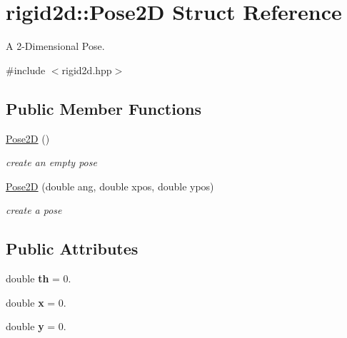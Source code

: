 \hypertarget{structrigid2d_1_1Pose2D}{}\section{rigid2d\+:\+:Pose2D Struct Reference}
\label{structrigid2d_1_1Pose2D}


A 2-\/\+Dimensional Pose.  




{\ttfamily \#include $<$rigid2d.\+hpp$>$}

\subsection*{Public Member Functions}
\begin{DoxyCompactItemize}
\item 
\mbox{\label{structrigid2d_1_1Pose2D_a88bf20c7ba06e18f9a8b01cef60e2c98}} 
\hyperlink{structrigid2d_1_1Pose2D_a88bf20c7ba06e18f9a8b01cef60e2c98}{Pose2D} ()
\begin{DoxyCompactList}\small\item\em create an empty pose \end{DoxyCompactList}\item 
\hyperlink{structrigid2d_1_1Pose2D_aec3600c75f7341955ba7e8881cdd101a}{Pose2D} (double ang, double xpos, double ypos)
\begin{DoxyCompactList}\small\item\em create a pose \end{DoxyCompactList}\end{DoxyCompactItemize}
\subsection*{Public Attributes}
\begin{DoxyCompactItemize}
\item 
\mbox{\label{structrigid2d_1_1Pose2D_aec39cadb59c95c2add01f01b07168a36}} 
double {\bfseries th} = 0.
\item 
\mbox{\label{structrigid2d_1_1Pose2D_a706d15249c213d0236481ff1bd13c42d}} 
double {\bfseries x} = 0.
\item 
\mbox{\label{structrigid2d_1_1Pose2D_a13f985853cc2b924ed87ed37e1857e7f}} 
double {\bfseries y} = 0.
\end{DoxyCompactItemize}


